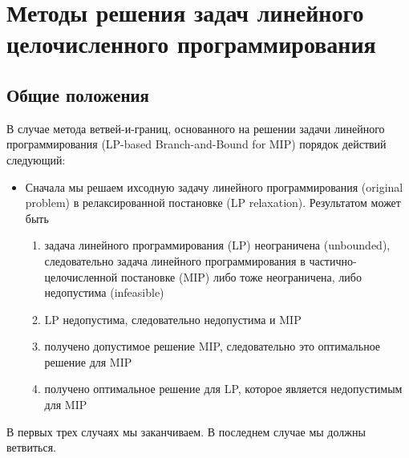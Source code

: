 \documentclass[%
	11pt,
	a4paper,
	utf8,
		]{article}
\begin{document}
\section{Методы решения задач линейного целочисленного программирования}

\subsection{Общие положения}

В случае метода ветвей-и-границ, основанного на решении задачи линейного программирования (LP-based Branch-and-Bound for MIP) порядок действий следующий:
\begin{itemize}
	\item Сначала мы решаем ихсодную задачу линейного программирования (original problem) в релаксированной постановке (LP relaxation). Результатом может быть
	\begin{enumerate}
		\item задача линейного программирования (LP) неограничена (unbounded), следовательно задача линейного программирования в частично-целочисленной постановке (MIP) либо тоже неограничена, либо недопустима (infeasible)
		
		\item LP недопустима, следовательно недопустима и MIP
		
		\item получено допустимое решение MIP, следовательно это оптимальное решение для MIP
		
		\item получено оптимальное решение для LP, которое является недопустимым для MIP
	\end{enumerate}
\end{itemize}

В первых трех случаях мы заканчиваем. В последнем случае мы должны ветвиться.

\end{document}
